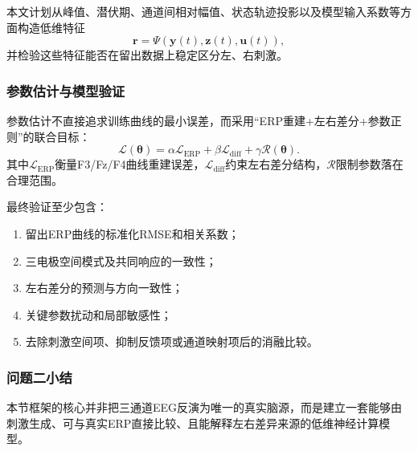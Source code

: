 本文计划从峰值、潜伏期、通道间相对幅值、状态轨迹投影以及模型输入系数等方面构造低维特征
\begin{equation}
\bm r
=
\Psi\!\left(
\bm y(t),\bm z(t),\bm u(t)
\right),
\end{equation}
并检验这些特征能否在留出数据上稳定区分左、右刺激。

\subsubsection{参数估计与模型验证}

参数估计不直接追求训练曲线的最小误差，而采用“ERP重建+左右差分+参数正则”的联合目标：
\begin{equation}
\mathcal L(\bm\theta)
=
\alpha\mathcal L_{\mathrm{ERP}}
+\beta\mathcal L_{\mathrm{diff}}
+\gamma\mathcal R(\bm\theta).
\end{equation}
其中$\mathcal L_{\mathrm{ERP}}$衡量F3/Fz/F4曲线重建误差，$\mathcal L_{\mathrm{diff}}$约束左右差分结构，$\mathcal R$限制参数落在合理范围。

最终验证至少包含：
\begin{enumerate}[label=(\arabic*)]
    \item 留出ERP曲线的标准化RMSE和相关系数；
    \item 三电极空间模式及共同响应的一致性；
    \item 左右差分的预测与方向一致性；
    \item 关键参数扰动和局部敏感性；
    \item 去除刺激空间项、抑制反馈项或通道映射项后的消融比较。
\end{enumerate}

\subsubsection{问题二小结}

本节框架的核心并非把三通道EEG反演为唯一的真实脑源，而是建立一套能够由刺激生成、可与真实ERP直接比较、且能解释左右差异来源的低维神经计算模型。
